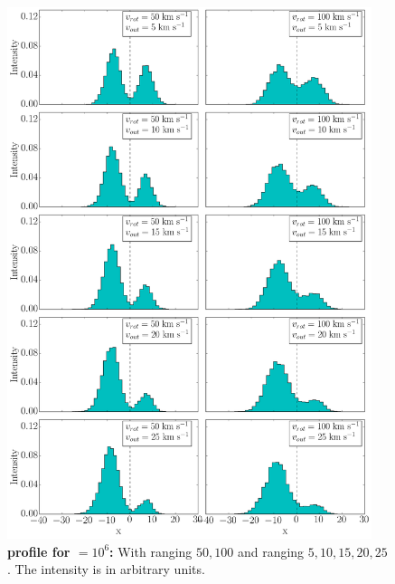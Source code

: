 \begin{figure}[h!]
	\begin{center}
		\includegraphics[width=0.95\textwidth]{./figures/chapter3/3_tau10E6_phi83-90}
	\end{center}
	\caption{\textbf{\lya profile for \tauh$=10^6$:} With \vrot ranging $50,100$ \kms and \vout ranging $5,10,15,20,25$ \kms. The intensity is in arbitrary units.
		\label{fig:3_tau10E6_phi83-90}}
\end{figure}

\newpage

